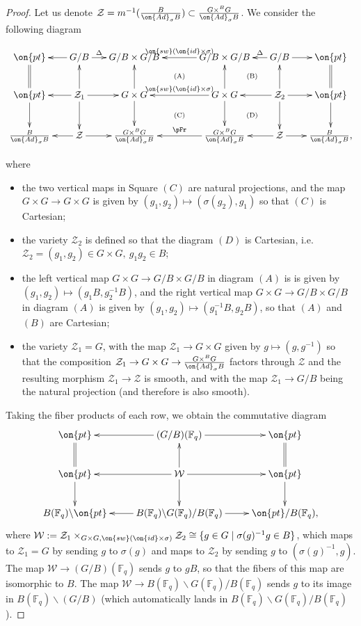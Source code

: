 \documentclass[11pt]{amsart}
\theoremstyle{definition}
\theoremstyle{definition}
\theoremstyle{definition}
\numberwithin{equation}{subsection}
\newcommand{\bF}{{\mathbb F}}
\newcommand{\mW}{{\mathcal W}}
\newcommand{\mZ}{{\mathcal Z}}
\newcommand{\Ad}{{\on{Ad}}}
\newcommand{\id}{{\on{id}}}
\begin{document}
\begin{proof}
Let us denote $\mZ=m^{-1}(\frac{B}{\Ad_\sigma B})\subset \frac{G\times^BG}{\Ad_\sigma B}$. We consider the following diagram
\begin{small}
\begin{equation}\label{E: cal coh corr to local}
\xymatrix@C=15pt{
\on{pt}&\ar[l] G/B\ar^-{\Delta}[r]& G/B\times G/B\ar@{}[drr]|{\mathrm{(A)}}&& G/B\times G/B\ar_-{\on{sw}(\id\times \sigma)}[ll]\ar@{}[dr]|{\mathrm{(B)}}&\ar_-\Delta[l] G/B\ar[r]& \on{pt}\\
\on{pt}\ar[d]\ar@{=}[u]&\ar[l] \mZ_1\ar[r]\ar[d]\ar[u]& G\times G\ar[d]\ar[u]\ar@{}[drr]|{\mathrm{(C)}}&&\ar_-{\on{sw}(\id\times \sigma)}[ll]G\times G\ar[d]\ar[u]\ar@{}[dr]|{\mathrm{(D)}}&\ar[l]\mZ_2\ar[r]\ar[d]\ar[u]&\on{pt}\ar[d]\ar@{=}[u]\\
\frac{B}{\Ad_\sigma B} & \mZ\ar[l]\ar[r]& \frac{G\times^BG}{\Ad_\sigma B}&&\ar_{\pFr}[ll]\frac{G\times^BG}{\Ad_\sigma B}&\ar[l] \mZ\ar[r]& \frac{B}{\Ad_\sigma B},
}
\end{equation}
\end{small}
where 
\begin{itemize}
\item the two vertical maps in Square $(C)$ are natural projections, and the map $G\times G\to G\times G$ is given by $(g_1, g_2)\mapsto (\sigma(g_2), g_1)$ so that $(C)$ is Cartesian;
\item the variety $\mZ_2$ is defined so that the diagram $(D)$ is Cartesian, i.e. $\mZ_2=(g_1,g_2)\in G\times G,\ g_1g_2\in B$;
\item the left vertical map $G\times G\to G/B\times G/B$ in diagram $(A)$ is is given by $(g_1,g_2)\mapsto (g_1B, g_2^{-1}B)$, and the right vertical map $G\times G\to G/B\times G/B$ in diagram $(A)$ is given by $(g_1,g_2)\mapsto (g_1^{-1}B,g_2B)$,  so that $(A)$ and $(B)$ are Cartesian;
\item the variety $\mZ_1=G$, with the map $\mZ_1\to G\times G$ given by $g\mapsto (g,g^{-1})$ so that the composition $\mZ_1\to G\times G\to \frac{G\times^BG}{\Ad_\sigma B}$ factors through $\mZ$ and the resulting morphism $\mZ_1 \to \mZ$ is smooth, and with the map $\mZ_1\to G/B$ being the natural projection (and therefore is also smooth).
\end{itemize}
Taking the fiber products of each row, we obtain the commutative diagram
\begin{equation*}
\xymatrix{
\on{pt}&\ar[l] (G/B)(\bF_q)\ar[r] & \on{pt}\\
\on{pt}\ar@{=}[u]\ar[d]&\ar[l] \mW \ar[u]\ar[d]\ar[r] & \on{pt}\ar@{=}[u]\ar[d]\\
B(\bF_q)\backslash \on{pt}&\ar[l] B(\bF_q)\backslash G(\bF_q)/B(\bF_q)\ar[r]& \on{pt}/B(\bF_q),
}\end{equation*}
where $\mW:=\mZ_1\times_{G\times G, \on{sw}(\id\times \sigma)}\mZ_2\cong\{g\in G\mid \sigma(g)^{-1}g\in B\}$, which maps to $\mZ_1=G$ by sending $g$ to $\sigma(g)$ and maps to $\mZ_2$ by sending $g$ to $(\sigma(g)^{-1},g)$. The map $\mW\to (G/B)(\bF_q)$ sends $g$ to $gB$, so that the fibers of this map are isomorphic to $B$. The map $\mW\to B(\bF_q)\backslash G(\bF_q)/B(\bF_q)$ sends $g$ to its image in $B(\bF_q)\backslash (G/B)$ (which automatically lands in $B(\bF_q)\backslash G(\bF_q)/B(\bF_q)$). 


\end{proof}
\end{document}
